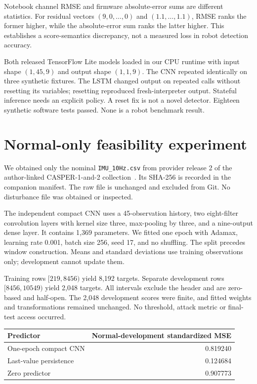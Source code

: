 \documentclass[11pt]{article}
\begin{document}
Notebook channel RMSE and firmware absolute-error sums are different statistics. For residual vectors $(9,0,\ldots,0)$ and $(1.1,\ldots,1.1)$, RMSE ranks the former higher, while the absolute-error sum ranks the latter higher. This establishes a score-semantics discrepancy, not a measured loss in robot detection accuracy.

Both released TensorFlow Lite models loaded in our CPU runtime with input shape $(1,45,9)$ and output shape $(1,1,9)$. The CNN repeated identically on three synthetic fixtures. The LSTM changed output on repeated calls without resetting its variables; resetting reproduced fresh-interpreter output. Stateful inference needs an explicit policy. A reset fix is not a novel detector. Eighteen synthetic software tests passed. None is a robot benchmark result.

\section{Normal-only feasibility experiment}
We obtained only the nominal \texttt{IMU\_10Hz.csv} from provider release 2 of the author-linked CASPER-1-and-2 collection~\cite{data}. Its SHA-256 is recorded in the companion manifest. The raw file is unchanged and excluded from Git. No disturbance file was obtained or inspected.

The independent compact CNN uses a 45-observation history, two eight-filter convolution layers with kernel size three, max-pooling by three, and a nine-output dense layer. It contains 1,369 parameters. We fitted one epoch with Adamax, learning rate 0.001, batch size 256, seed 17, and no shuffling. The split precedes window construction. Means and standard deviations use training observations only; development cannot update them.

Training rows $[219,8456)$ yield 8,192 targets. Separate development rows $[8456,10549)$ yield 2,048 targets. All intervals exclude the header and are zero-based and half-open. The 2,048 development scores were finite, and fitted weights and transformations remained unchanged. No threshold, attack metric or final-test access occurred.

\begin{center}
\begin{tabular}{lr}
\toprule
Predictor & Normal-development standardized MSE\\
\midrule
One-epoch compact CNN & 0.819240\\
Last-value persistence & 0.124684\\
Zero predictor & 0.907773\\
\bottomrule
\end{tabular}
\end{center}
\end{document}
